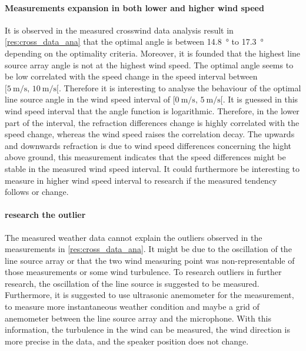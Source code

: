 \paragraph{Measurements expansion in both lower and higher wind speed} 
It is observed in the measured crosswind data analysis result in \autoref{res:cross_data_ana} that the optimal angle is between \SI{14.8}{\degree} to \SI{17.3}{\degree} depending on the optimality criteria. Moreover, it is founded that the highest line source array angle is not at the highest wind speed. The optimal angle seems to be low correlated with the speed change in the speed interval between $[\SI{5}{\meter\per\second},\, \SI{10}{\meter\per\second}[ $. Therefore it is interesting to analyse the behaviour of the optimal line source angle in the wind speed interval of $[\SI{0}{\meter\per\second},\, \SI{5}{\meter\per\second}[ $. It is guessed in this wind speed interval that the angle function is logarithmic. Therefore, in the lower part of the interval, the refraction differences change is highly correlated with the speed change, whereas the wind speed raises the correlation decay. The upwards and downwards refraction is due to wind speed differences concerning the hight above ground, this measurement indicates that the speed differences might be stable in the measured wind speed interval. It could furthermore be interesting to measure in higher wind speed interval to research if the measured tendency follows or change. 



\paragraph{research the outlier}
The measured weather data cannot explain the outliers observed in the measurements in \autoref{res:cross_data_ana}. It might be due to the oscillation of the line source array or that the two wind measuring point was non-representable of those measurements or some wind turbulence. To research outliers in further research, the oscillation of the line source is suggested to be measured. Furthermore, it is suggested to use ultrasonic anemometer for the measurement, to measure more instantaneous weather condition and maybe a grid of anemometer between the line source array and the microphone. With this information, the turbulence in the wind can be measured, the wind direction is more precise in the data, and the speaker position does not change. 




